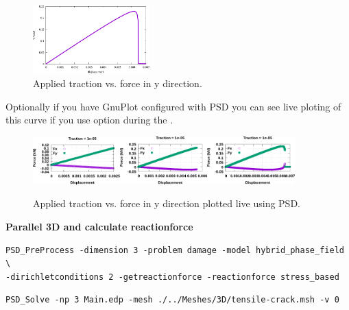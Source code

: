 \begin{figure}[h!]
\centering

\includegraphics[width=0.4\textwidth]{./Images/plot-fd.png}
\caption{Applied traction vs. force in y direction. \label{fd-plot}}
\end{figure}

Optionally if you have GnuPlot configured with PSD you can see live
ploting of this curve if you use option  during
the .

\begin{figure}[h!]
\centering

\includegraphics[width=0.3\textwidth]{./Images/gp0.png}\includegraphics[width=0.3\textwidth]{./Images/gp1.png}\includegraphics[width=0.3\textwidth]{./Images/gp2.png}
\caption{Applied traction vs. force in y direction plotted live using PSD. \label{gnuplot-plot}}
\end{figure}

\textbf{Parallel 3D and calculate reactionforce}

\begin{lstlisting}[style=BashInputStyle]
PSD_PreProcess -dimension 3 -problem damage -model hybrid_phase_field \
-dirichletconditions 2 -getreactionforce -reactionforce stress_based
\end{lstlisting}

\begin{lstlisting}[style=BashInputStyle]
PSD_Solve -np 3 Main.edp -mesh ./../Meshes/3D/tensile-crack.msh -v 0
\end{lstlisting}
